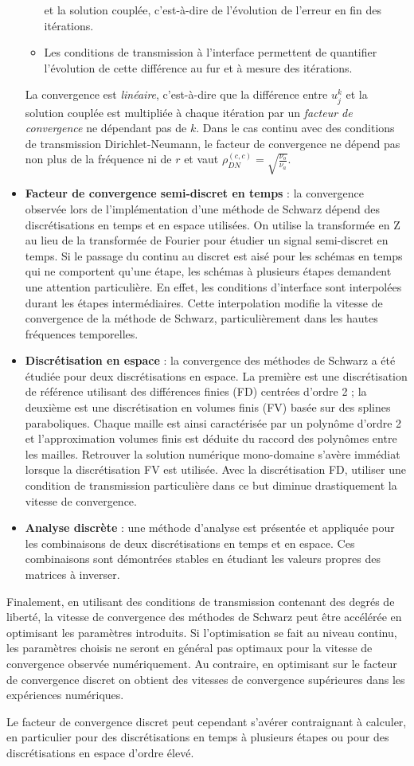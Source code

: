 \begin{itemize}
\begin{itemize}
	et la solution couplée, c'est-à-dire
	de l'évolution de l'erreur en fin des itérations.
\item Les conditions de transmission à l'interface permettent
	de quantifier l'évolution de cette différence au fur et
	à mesure des itérations.
\end{itemize}
 La convergence est \textit{linéaire},
 c'est-à-dire que la différence entre $u_j^k$ et la solution couplée
 est multipliée à chaque itération par un
 \textit{facteur de convergence} ne dépendant
 pas de $k$. Dans le cas continu avec des conditions
 de transmission Dirichlet-Neumann, le facteur de convergence ne
 dépend pas non plus de la fréquence ni de $r$ et vaut
 $\rho_{DN}^{(c,c)}=\sqrt{\frac{\nu_o}{\nu_a}}$.
\item \textbf{Facteur de convergence semi-discret en temps} :
la convergence observée lors de l'implémentation d'une méthode
de Schwarz dépend des discrétisations en temps et en espace utilisées.
On utilise la transformée en Z au lieu de la transformée de Fourier
pour étudier un signal semi-discret en temps.
Si le passage du continu au discret est aisé pour les schémas
en temps qui ne comportent qu'une étape, les schémas
à plusieurs étapes demandent une attention particulière. En effet,
les conditions d'interface sont interpolées durant les étapes
intermédiaires. Cette interpolation
modifie la vitesse de convergence de la méthode de Schwarz,
particulièrement dans les hautes fréquences temporelles.
\item \textbf{Discrétisation en espace} :
la convergence des méthodes de Schwarz a été étudiée pour
deux discrétisations en espace. La première est une discrétisation
de référence utilisant des différences finies (FD)
centrées d'ordre 2 ;
la deuxième est une discrétisation en volumes finis (FV) basée sur
des splines paraboliques.
Chaque maille est ainsi caractérisée par un polynôme d'ordre 2
et l'approximation volumes finis est déduite du raccord des
polynômes entre les mailles.
Retrouver la solution numérique mono-domaine s'avère immédiat
lorsque la discrétisation FV est utilisée.
Avec la discrétisation FD, utiliser une condition de transmission
particulière dans ce but diminue
drastiquement la vitesse de convergence.
\item \textbf{Analyse discrète} :
une méthode d'analyse est présentée et appliquée pour les combinaisons
de deux discrétisations en temps et en espace. Ces combinaisons
sont démontrées stables en étudiant les valeurs propres des
matrices à inverser.
\end{itemize}
Finalement, en utilisant des conditions de transmission
contenant des degrés de liberté, la vitesse de convergence
des méthodes de Schwarz peut être accélérée en optimisant les
paramètres introduits.
Si l'optimisation se fait au niveau continu, les paramètres
choisis ne seront en général pas optimaux pour la vitesse de
convergence observée numériquement. Au contraire, en optimisant
sur le facteur de convergence discret on obtient des vitesses de
convergence supérieures dans les expériences numériques.
\par
Le facteur de convergence discret peut cependant s'avérer
contraignant à calculer, en particulier pour des discrétisations
en temps à plusieurs étapes ou pour des discrétisations en espace
d'ordre élevé.
